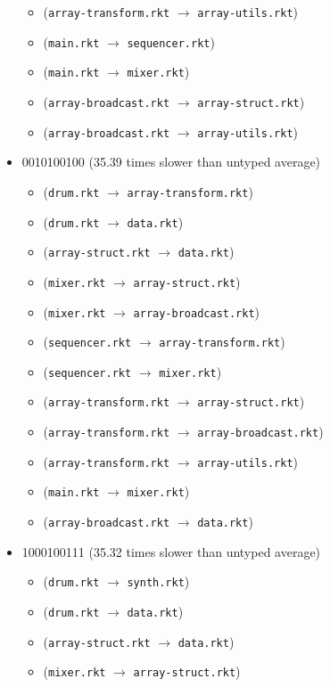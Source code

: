 \documentclass{article}
\newcommand{\mono}[1]{\texttt{#1}}
\begin{document}
\begin{itemize}
\begin{itemize}
  \item (\mono{array-transform.rkt} $\rightarrow$ \mono{array-utils.rkt})
  \item (\mono{main.rkt} $\rightarrow$ \mono{sequencer.rkt})
  \item (\mono{main.rkt} $\rightarrow$ \mono{mixer.rkt})
  \item (\mono{array-broadcast.rkt} $\rightarrow$ \mono{array-struct.rkt})
  \item (\mono{array-broadcast.rkt} $\rightarrow$ \mono{array-utils.rkt})
  \end{itemize}
\item 0010100100 (35.39 times slower than untyped average)
  \begin{itemize}
  \item (\mono{drum.rkt} $\rightarrow$ \mono{array-transform.rkt})
  \item (\mono{drum.rkt} $\rightarrow$ \mono{data.rkt})
  \item (\mono{array-struct.rkt} $\rightarrow$ \mono{data.rkt})
  \item (\mono{mixer.rkt} $\rightarrow$ \mono{array-struct.rkt})
  \item (\mono{mixer.rkt} $\rightarrow$ \mono{array-broadcast.rkt})
  \item (\mono{sequencer.rkt} $\rightarrow$ \mono{array-transform.rkt})
  \item (\mono{sequencer.rkt} $\rightarrow$ \mono{mixer.rkt})
  \item (\mono{array-transform.rkt} $\rightarrow$ \mono{array-struct.rkt})
  \item (\mono{array-transform.rkt} $\rightarrow$ \mono{array-broadcast.rkt})
  \item (\mono{array-transform.rkt} $\rightarrow$ \mono{array-utils.rkt})
  \item (\mono{main.rkt} $\rightarrow$ \mono{mixer.rkt})
  \item (\mono{array-broadcast.rkt} $\rightarrow$ \mono{data.rkt})
  \end{itemize}
\item 1000100111 (35.32 times slower than untyped average)
  \begin{itemize}
  \item (\mono{drum.rkt} $\rightarrow$ \mono{synth.rkt})
  \item (\mono{drum.rkt} $\rightarrow$ \mono{data.rkt})
  \item (\mono{array-struct.rkt} $\rightarrow$ \mono{data.rkt})
  \item (\mono{mixer.rkt} $\rightarrow$ \mono{array-struct.rkt})

\end{itemize}
\end{itemize}
\end{document}
